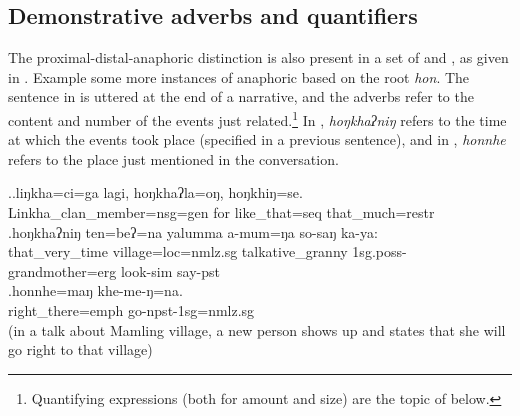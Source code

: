 \subsection{Demonstrative adverbs and quantifiers}\label{dem-set1rel}

The proximal-distal-anaphoric distinction is also present in a set of  and , as given in . Example \Next some more instances of anaphoric  based on the root \emph{hon}. The sentence in \Next[a] is uttered at the end of a narrative, and the adverbs refer to the content and number of the events just related.\footnote{Quantifying expressions (both for amount and size) are the topic of  below.}  In \Next[b], \emph{hoŋkhaʔniŋ} refers to the time at which the events took place (specified in a previous sentence), and in \Next[c], \emph{honnhe} refers to the place just mentioned in the conversation.
\largerpage[2]

\ex.\ag.liŋkha=ci=ga         lagi, hoŋkhaʔla=oŋ,    hoŋkhiŋ=se.\\
Linkha\_clan\_member{\sc =nsg=gen} for like\_that{\sc =seq} that\_much{\sc =restr}\\
 
\bg.hoŋkhaʔniŋ ten=beʔ=na               yalumma          a-mum=ŋa   so-saŋ    ka-ya:\\
that\_very\_time village{\sc =loc=nmlz.sg} talkative\_granny  {\sc 1sg.poss-}grandmother{\sc =erg} look{\sc -sim} say{\sc [3sg]-pst}\\
  
\bg.honnhe=maŋ khe-me-ŋ=na.\\
right\_there{\sc =emph} go{\sc -npst-1sg=nmlz.sg}\\
 (in a talk about Mamling village, a new person shows up and states that she will go right to that village)	
	
